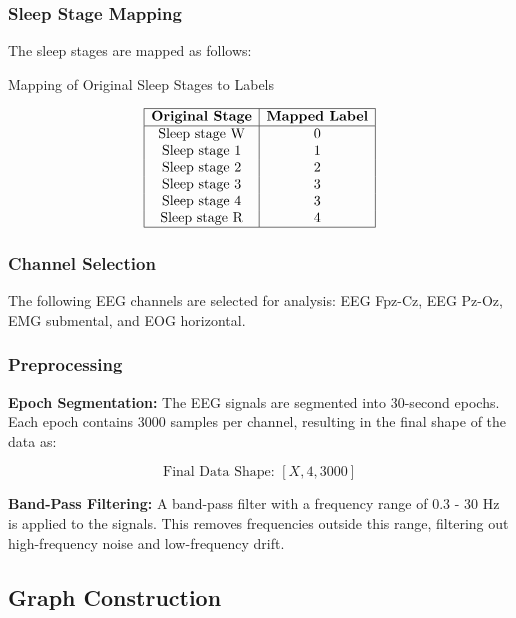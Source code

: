 \subsubsection{Sleep Stage Mapping}

The sleep stages are mapped as follows:

\begin{table}[h]
\centering
\caption{Mapping of Original Sleep Stages to Labels}
\[
\begin{array}{|c|c|}
\hline
\textbf{Original Stage} & \textbf{Mapped Label} \\
\hline
\text{Sleep stage W} & 0 \\
\text{Sleep stage 1} & 1 \\
\text{Sleep stage 2} & 2 \\
\text{Sleep stage 3} & 3 \\
\text{Sleep stage 4} & 3 \\
\text{Sleep stage R} & 4 \\
\hline
\end{array}
\]
\label{tab:sleep_stage_mapping}
\end{table}


\subsubsection{Channel Selection}

The following EEG channels are selected for analysis: EEG Fpz-Cz, EEG Pz-Oz, EMG submental, and EOG horizontal.

\subsubsection{Preprocessing}

\textbf{Epoch Segmentation:}  
The EEG signals are segmented into 30-second epochs. Each epoch contains 3000 samples per channel, resulting in the final shape of the data as:

\[
\text{Final Data Shape: } [X, 4, 3000]
\]

\textbf{Band-Pass Filtering:}  
A band-pass filter with a frequency range of 0.3 - 30 Hz is applied to the signals. This removes frequencies outside this range, filtering out high-frequency noise and low-frequency drift.






\subsection{Graph Construction}

